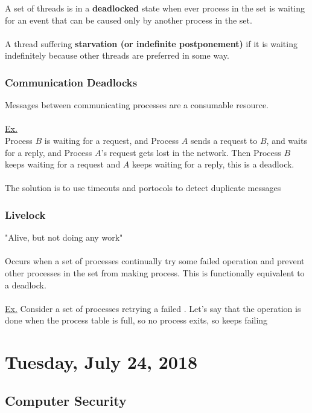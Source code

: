 \documentclass{article}
\begin{document}
A set of threads is in a \textbf{deadlocked} state when ever process in the set is waiting for an event that can be caused only by another process in the set.
\\
\\
A thread suffering \textbf{starvation (or indefinite postponement)} if it is waiting indefinitely because other threads are preferred in some way.

\subsubsection{Communication Deadlocks}

Messages between communicating processes are a consumable resource.
\\
\\
\underline{Ex.}\\
Process $B$ is waiting for a request, and Process $A$ sends a request to $B$, and waits for a reply, and Process $A$'s request gets lost in the network. Then Process $B$ keeps waiting for a request and $A$ keeps waiting for a reply, this is a deadlock.
\\
\\
The solution is to use timeouts and portocols to detect duplicate messages

\subsubsection{Livelock}

"Alive, but not doing any work"
\\
\\
Occurs when a set of processes continually try some failed operation and prevent other processes in the set from making process. This is functionally equivalent to a deadlock.
\\
\\
\underline{Ex.} Consider a set of processes retrying a failed . Let's say that the operation is done when the process table is full, so no process exits, so  keeps failing

\newpage

\section{Tuesday, July 24, 2018}

\subsection{Computer Security}
\end{document}

